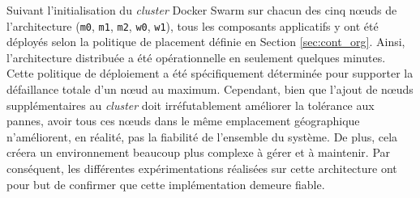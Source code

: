 Suivant l'initialisation du \textit{cluster} Docker Swarm sur chacun des cinq n\oe{}uds de l'architecture (\texttt{m0}, \texttt{m1}, \texttt{m2}, \texttt{w0}, \texttt{w1}), tous les composants applicatifs y ont été déployés selon la politique de placement définie en Section \ref{sec:cont_org}. Ainsi, l'architecture distribuée a été opérationnelle en seulement quelques minutes. Cette politique de déploiement a été spécifiquement déterminée pour supporter la défaillance totale d'un n\oe{}ud au maximum. Cependant, bien que l'ajout de n\oe{}uds supplémentaires au \textit{cluster} doit irréfutablement améliorer la tolérance aux pannes, avoir tous ces n\oe{}uds dans le même emplacement géographique n'améliorent, en réalité, pas la fiabilité de l'ensemble du système. De plus, cela créera un environnement beaucoup plus complexe à gérer et à maintenir. Par conséquent, les différentes expérimentations réalisées sur cette architecture ont pour but de confirmer que cette implémentation demeure fiable.

